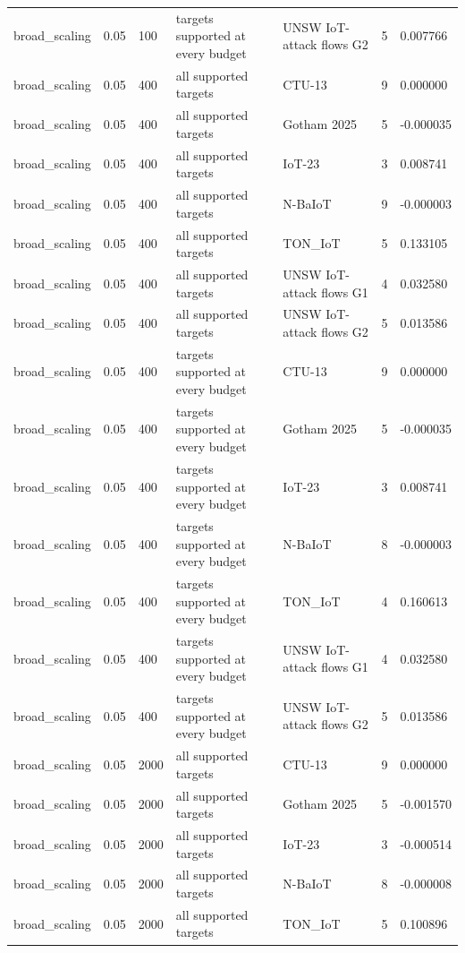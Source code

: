 \begin{tabular}{lllllll}
broad\_scaling & 0.05 & 100 & targets supported at every budget & UNSW IoT-attack flows G2 & 5 & 0.007766 \\
broad\_scaling & 0.05 & 400 & all supported targets & CTU-13 & 9 & 0.000000 \\
broad\_scaling & 0.05 & 400 & all supported targets & Gotham 2025 & 5 & -0.000035 \\
broad\_scaling & 0.05 & 400 & all supported targets & IoT-23 & 3 & 0.008741 \\
broad\_scaling & 0.05 & 400 & all supported targets & N-BaIoT & 9 & -0.000003 \\
broad\_scaling & 0.05 & 400 & all supported targets & TON\_IoT & 5 & 0.133105 \\
broad\_scaling & 0.05 & 400 & all supported targets & UNSW IoT-attack flows G1 & 4 & 0.032580 \\
broad\_scaling & 0.05 & 400 & all supported targets & UNSW IoT-attack flows G2 & 5 & 0.013586 \\
broad\_scaling & 0.05 & 400 & targets supported at every budget & CTU-13 & 9 & 0.000000 \\
broad\_scaling & 0.05 & 400 & targets supported at every budget & Gotham 2025 & 5 & -0.000035 \\
broad\_scaling & 0.05 & 400 & targets supported at every budget & IoT-23 & 3 & 0.008741 \\
broad\_scaling & 0.05 & 400 & targets supported at every budget & N-BaIoT & 8 & -0.000003 \\
broad\_scaling & 0.05 & 400 & targets supported at every budget & TON\_IoT & 4 & 0.160613 \\
broad\_scaling & 0.05 & 400 & targets supported at every budget & UNSW IoT-attack flows G1 & 4 & 0.032580 \\
broad\_scaling & 0.05 & 400 & targets supported at every budget & UNSW IoT-attack flows G2 & 5 & 0.013586 \\
broad\_scaling & 0.05 & 2000 & all supported targets & CTU-13 & 9 & 0.000000 \\
broad\_scaling & 0.05 & 2000 & all supported targets & Gotham 2025 & 5 & -0.001570 \\
broad\_scaling & 0.05 & 2000 & all supported targets & IoT-23 & 3 & -0.000514 \\
broad\_scaling & 0.05 & 2000 & all supported targets & N-BaIoT & 8 & -0.000008 \\
broad\_scaling & 0.05 & 2000 & all supported targets & TON\_IoT & 5 & 0.100896 \\

\end{tabular}
